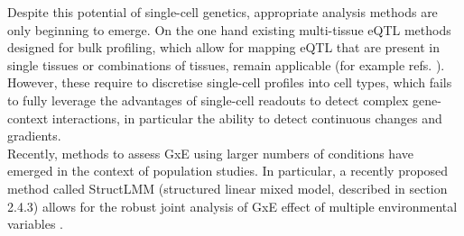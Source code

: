 Despite this potential of single-cell genetics, appropriate analysis methods are only beginning to emerge. 
On the one hand existing multi-tissue eQTL methods designed for bulk profiling, which allow for mapping eQTL that are present in single tissues or combinations of tissues, remain applicable 
(for example refs. \cite{ding2010gene, petretto2010new, nica2011architecture, fu2012unraveling, flutre2013statistical,sul2013effectively, di2014meta, li2018empirical, urbut2019flexible}).
\\

However, these require to discretise single-cell profiles into cell types, which fails to fully leverage the advantages of single-cell readouts to detect complex gene-context interactions, in particular the ability to detect continuous changes and gradients. \\

Recently, methods to assess GxE using larger numbers of conditions have emerged in the context of population studies.
In particular, a recently proposed method called StructLMM (structured linear mixed model, described in section 
2.4.3) allows for the robust joint analysis of GxE effect of multiple environmental variables \cite{moore2019linear}. \\




